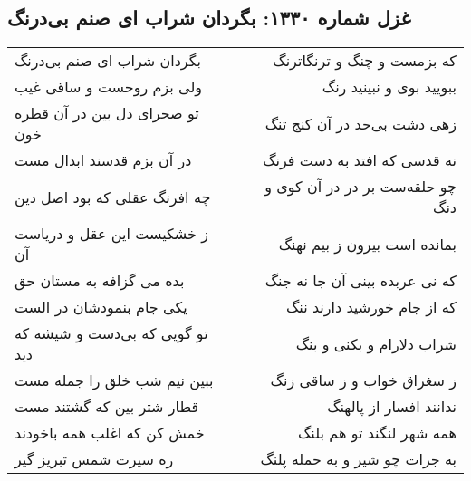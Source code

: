 \begin{center}
\section*{غزل شماره ۱۳۳۰: بگردان شراب ای صنم بی‌درنگ}
\label{sec:1330}
\begin{longtable}{l p{0.5cm} r}
بگردان شراب ای صنم بی‌درنگ
&&
که بزمست و چنگ و ترنگاترنگ
\\
ولی بزم روحست و ساقی غیب
&&
ببویید بوی و نبینید رنگ
\\
تو صحرای دل بین در آن قطره خون
&&
زهی دشت بی‌حد در آن کنج تنگ
\\
در آن بزم قدسند ابدال مست
&&
نه قدسی که افتد به دست فرنگ
\\
چه افرنگ عقلی که بود اصل دین
&&
چو حلقه‌ست بر در در آن کوی و دنگ
\\
ز خشکیست این عقل و دریاست آن
&&
بمانده است بیرون ز بیم نهنگ
\\
بده می گزافه به مستان حق
&&
که نی عربده بینی آن جا نه جنگ
\\
یکی جام بنمودشان در الست
&&
که از جام خورشید دارند ننگ
\\
تو گویی که بی‌دست و شیشه که دید
&&
شراب دلارام و بکنی و بنگ
\\
ببین نیم شب خلق را جمله مست
&&
ز سغراق خواب و ز ساقی زنگ
\\
قطار شتر بین که گشتند مست
&&
ندانند افسار از پالهنگ
\\
خمش کن که اغلب همه باخودند
&&
همه شهر لنگند تو هم بلنگ
\\
ره سیرت شمس تبریز گیر
&&
به جرات چو شیر و به حمله پلنگ
\\
\end{longtable}
\end{center}

